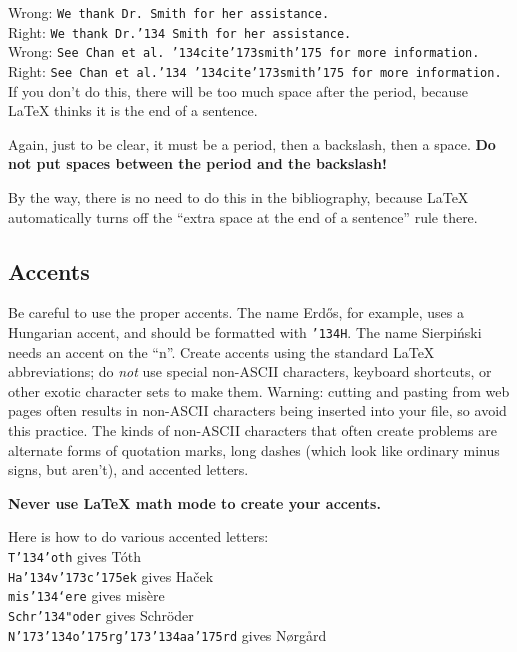 \documentclass[12pt]{article}
\begin{document}
\noindent Wrong:
{\tt We thank Dr.\ Smith for her assistance.} \\
\noindent Right:
{\tt We thank Dr.\char'134\ Smith for her assistance.}  \\

\noindent Wrong:
{\tt See Chan et al.\ \char'134cite\char'173smith\char'175\ for more information.}\\
\noindent Right:
{\tt See Chan et al.\char'134\ \char'134cite\char'173smith\char'175\ for more information.}\\

\noindent If you don't do this, there will be too much space
after the period, because LaTeX thinks it is the end of a sentence.

Again, just to be clear, it must be a period, then a backslash, then a space.
{\bf Do not put spaces between the period and the backslash!}

By the way,
there is no need to do this in the bibliography, because LaTeX automatically
turns off the ``extra space at the end of a sentence'' rule there.

\subsection{Accents}

    Be careful to use the proper accents.  The name
Erd\H{o}s, for example, uses a Hungarian accent, and
should be formatted with {\tt\char'134H}.  The name
Sierpi\'nski needs an accent on the ``n''.
Create accents using
the standard LaTeX abbreviations; do 
{\it not\/} use special non-ASCII characters, keyboard shortcuts,
or other exotic character sets to make them.  Warning: cutting and pasting
from web pages often results in non-ASCII 
characters being inserted into
your file, so avoid this practice.
The kinds of non-ASCII 
characters that often create problems
are alternate forms of quotation marks, long dashes (which look like ordinary
minus signs, but aren't), and accented letters.

{\bf Never use LaTeX math mode to create your accents.}

Here is how to do various accented letters: \\
	{\tt T\char'134'oth} gives T\'oth \\
	{\tt Ha{\char'134}v{\char'173}c{\char'175}ek} gives Ha\v{c}ek \\
	{\tt mis\char'134`ere} gives mis\`ere \\
	{\tt Schr\char'134"oder} gives Schr\"oder \\
	{\tt N\char'173\char'134o\char'175rg\char'173\char'134aa\char'175rd} gives N{\o}rg{\aa}rd
\end{document}
